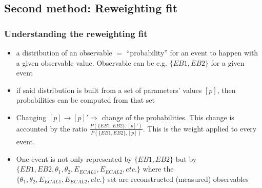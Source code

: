 \documentclass[handout]{beamer}
\begin{document}
\subsection{Second method: Reweighting fit}
\begin{frame}
\frametitle{Understanding the reweighting fit}
\begin{itemize}
  \item a \alert{distribution} of an observable $=$ \alert{``probability''} for
  an event to happen with a given observable value. Observable can be e.g.
  $\{EB1,EB2\}$ for a given event%
  \item if said distribution is built from a set of parameters' values
  $[p]$, then probabilities can be computed from that set
  \item Changing $[p]\to [p]'\Rightarrow$ change of the probabilities. This
  change is accounted by the ratio $\frac{P(\{EB1,EB2\},
  [p]')}{P(\{EB1,EB2\},[p])}$. This is the weight applied to every event.
  \item One event is not only represented by $\{EB1,EB2\}$ but by
  $\{EB1,EB2,\theta_1,\theta_2,E_{ECAL1},E_{ECAL2},etc.\}$ where the
  $\{\theta_1,\theta_2,E_{ECAL1},E_{ECAL2},etc.\}$ set are reconstructed
  (measured) observables
\end{itemize}
\end{frame}
\end{document}
